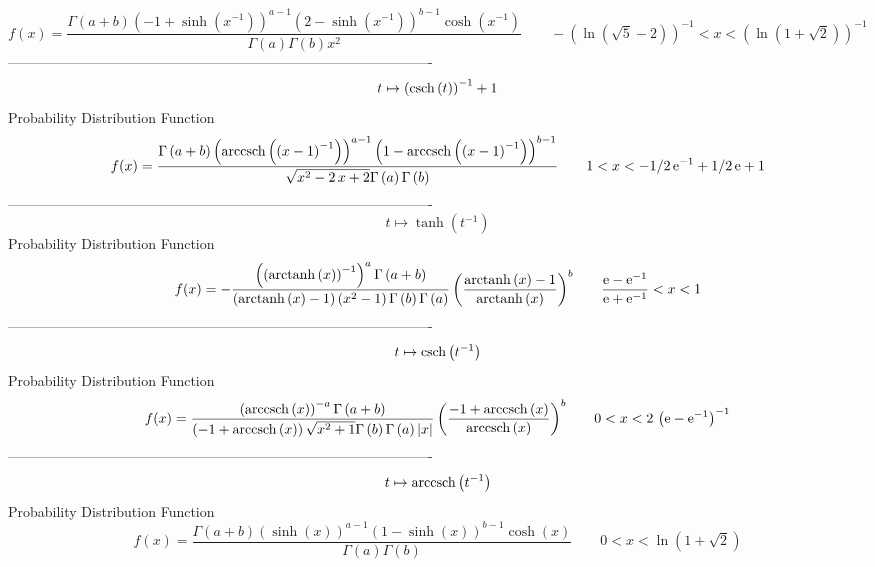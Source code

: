 \documentclass[12pt]{article}
\begin{document}
$$  f(x)={\frac {\Gamma \left( a+b \right)  \left( -1+\sinh \left( {x}^{-1}
 \right)  \right) ^{a-1} \left( 2-\sinh \left( {x}^{-1} \right) 
 \right) ^{b-1}\cosh \left( {x}^{-1} \right) }{\Gamma \left( a
 \right) \Gamma \left( b \right) {x}^{2}}}
 \qquad- \left( \ln  \left( \sqrt {5}-2 \right)  \right) ^{-1}
 < x <  \left( \ln  \left( 1+\sqrt {2} \right)  \right) ^{-1}
$$-------------------------------------------------------------------------------------------  \\$$t\mapsto  \left( {\rm csch} \left(t\right) \right) ^{-1}+1
$$Probability Distribution Function 
$$  f(x)={\frac {\Gamma \left( a+b \right)  \left( {\rm arccsch} \left( \left( 
x-1 \right) ^{-1}\right) \right) ^{a-1} \left( 1-{\rm arccsch} \left(
 \left( x-1 \right) ^{-1}\right) \right) ^{b-1}}{\sqrt {{x}^{2}-2\,x+2
}\Gamma \left( a \right) \Gamma \left( b \right) }}
 \qquad1
 < x < -1/2\,{{\rm e}^{-1}}+1/2\,{\rm e}+1
$$-------------------------------------------------------------------------------------------  \\$$t\mapsto \tanh \left( {t}^{-1} \right) 
$$Probability Distribution Function 
$$  f(x)=-{\frac { \left(  \left( {\rm arctanh} \left(x\right) \right) ^{-1}
 \right) ^{a}\Gamma \left( a+b \right) }{ \left( {\rm arctanh} \left(x
\right)-1 \right)  \left( {x}^{2}-1 \right) \Gamma \left( b \right) 
\Gamma \left( a \right) } \left( {\frac {{\rm arctanh} \left(x\right)-
1}{{\rm arctanh} \left(x\right)}} \right) ^{b}}
 \qquad{\frac {{\rm e}-{{\rm e}^{-1}}}{{\rm e}+{{\rm e}^{-1}}}}
 < x < 1
$$-------------------------------------------------------------------------------------------  \\$$t\mapsto {\rm csch} \left({t}^{-1}\right)
$$Probability Distribution Function 
$$  f(x)={\frac { \left( {\rm arccsch} \left(x\right) \right) ^{-a}\Gamma
 \left( a+b \right) }{ \left( -1+{\rm arccsch} \left(x\right) \right) 
\sqrt {{x}^{2}+1}\Gamma \left( b \right) \Gamma \left( a \right) 
 \left| x \right| } \left( {\frac {-1+{\rm arccsch} \left(x\right)}{
{\rm arccsch} \left(x\right)}} \right) ^{b}}
 \qquad0
 < x < 2\, \left( {\rm e}-{{\rm e}^{-1}} \right) ^{-1}
$$-------------------------------------------------------------------------------------------  \\$$t\mapsto {\rm arccsch} \left({t}^{-1}\right)
$$Probability Distribution Function 
$$  f(x)={\frac {\Gamma \left( a+b \right)  \left( \sinh \left( x \right) 
 \right) ^{a-1} \left( 1-\sinh \left( x \right)  \right) ^{b-1}\cosh
 \left( x \right) }{\Gamma \left( a \right) \Gamma \left( b \right) }}
 \qquad0
 < x < \ln  \left( 1+\sqrt {2} \right) 
$$
\end{document}
